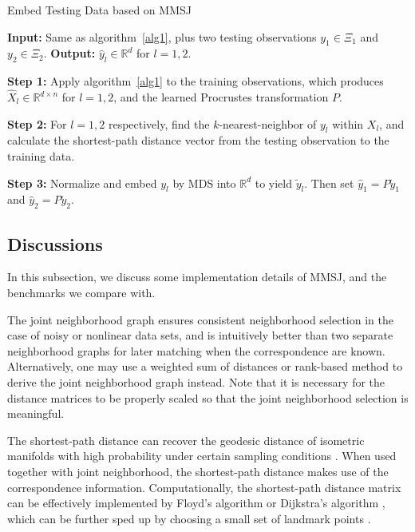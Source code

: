\documentclass[times,twocolumn,final]{elsarticle}
\begin{document}
\begin{algorithm}
\caption{Embed Testing Data based on MMSJ}
\label{alg2}
\begin{algorithmic}
\State \textbf{Input: } Same as algorithm~\ref{alg1}, plus two testing observations $y_{1} \in \Xi_{1}$ and $y_{2} \in \Xi_{2}$.
\State \textbf{Output: } $\hat{y}_{l} \in \mathbb{R}^{d}$ for $l=1,2$.

\State \textbf{Step 1:} Apply algorithm~\ref{alg1} to the training observations, which produces $\hat{X}_{l} \in \mathbb{R}^{d \times n}$ for $l=1,2$, and the learned Procrustes transformation $P$.

\State \textbf{Step 2:} For $l=1,2$ respectively, find the $k$-nearest-neighbor of $y_{l}$ within $X_{l}$, and calculate the shortest-path distance vector from the testing observation to the training data.

\State \textbf{Step 3:} Normalize and embed $y_{l}$ by MDS into $\mathbb{R}^{d}$ to yield $\tilde{y}_{l}$. Then set $\hat{y}_{1}=P \tilde{y}_{1}$ and $\hat{y}_{2}=P \tilde{y}_{2}$.
\end{algorithmic}
\end{algorithm}

\subsection{Discussions}
\label{discuss}
In this subsection, we discuss some implementation details of MMSJ, and the benchmarks we compare with.

The joint neighborhood graph ensures consistent neighborhood selection in the case of noisy or nonlinear data sets, and is intuitively better than two separate neighborhood graphs for later matching when the correspondence are known. Alternatively, one may use a weighted sum of distances or rank-based method to derive the joint neighborhood graph instead. Note that it is necessary for the distance matrices to be properly scaled so that the joint neighborhood selection is meaningful. 
%
%

The shortest-path distance can recover the geodesic distance of isometric manifolds with high probability under certain sampling conditions \citep{BernsteinEtAl2000, SilvaTenenbaum2003}. When used together with joint neighborhood, the shortest-path distance makes use of the correspondence information. Computationally, the shortest-path distance matrix can be effectively implemented by Floyd's algorithm or Dijkstra's algorithm \citep{TenenbaumSilvaLangford2000}, which can be further sped up by choosing a small set of landmark points \citep{SilvaTenenbaum2003, BengioEtal2003}.  
\end{document}
